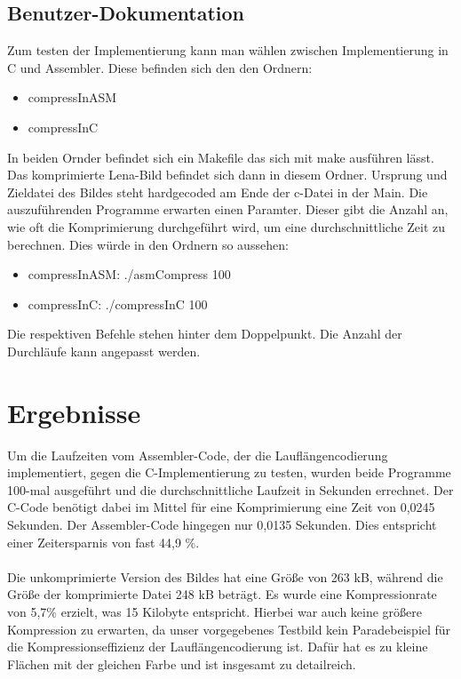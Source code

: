 \documentclass[11pt]{scrartcl}
\begin{document}
\subsection{Benutzer-Dokumentation}
Zum testen der Implementierung kann man wählen zwischen Implementierung in C und Assembler. Diese befinden sich den den Ordnern:
\begin{itemize}
\item compressInASM
\item compressInC
\end{itemize}
In beiden Ornder befindet sich ein Makefile das sich mit make ausführen lässt. Das komprimierte Lena-Bild befindet sich dann in diesem Ordner. Ursprung und Zieldatei des Bildes steht hardgecoded am Ende der c-Datei in der Main.
Die auszuführenden Programme erwarten einen Paramter. Dieser gibt die Anzahl an, wie oft die Komprimierung durchgeführt wird, um eine durchschnittliche Zeit zu berechnen. Dies würde in den Ordnern so aussehen:
\begin{itemize}
\item compressInASM: ./asmCompress 100
\item compressInC: ./compressInC 100
\end{itemize}
Die respektiven Befehle stehen hinter dem Doppelpunkt. Die Anzahl der Durchläufe kann angepasst werden.

\section{Ergebnisse}\label{sec:ergebnisse}

Um die Laufzeiten vom Assembler-Code, der die Lauflängencodierung implementiert, gegen die C-Implementierung zu testen, wurden beide Programme 100-mal ausgeführt und die durchschnittliche Laufzeit in Sekunden errechnet. Der C-Code benötigt dabei im Mittel für eine Komprimierung eine Zeit von 0,0245 Sekunden. Der Assembler-Code hingegen nur 0,0135 Sekunden. Dies entspricht einer Zeitersparnis von fast 44,9 \%.\\
\\
Die unkomprimierte  Version des Bildes hat eine Größe von 263 kB, während die Größe der komprimierte Datei  248 kB beträgt. Es wurde eine Kompressionrate von 5,7\% erzielt, was 15 Kilobyte entspricht. Hierbei war auch keine größere Kompression zu erwarten, da unser vorgegebenes Testbild kein Paradebeispiel für die Kompressionseffizienz der Lauflängencodierung ist. Dafür hat es zu kleine Flächen mit der gleichen Farbe und ist insgesamt zu detailreich.
\end{document}
